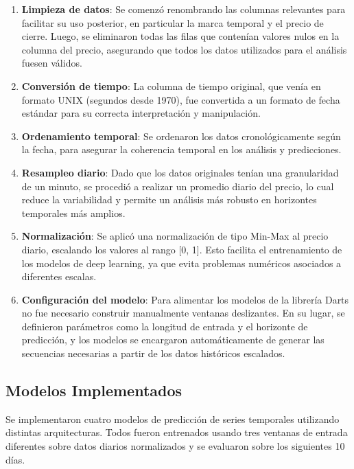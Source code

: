 \documentclass[12pt]{article}
\begin{document}
\begin{enumerate}
\item \textbf{Limpieza de datos}: Se comenzó renombrando las columnas relevantes para facilitar su uso posterior,
en particular la marca temporal y el precio de cierre. Luego, se eliminaron todas las filas que contenían valores
nulos en la columna del precio, asegurando que todos los datos utilizados para el análisis fuesen válidos.

\item \textbf{Conversión de tiempo}: La columna de tiempo original, que venía en formato UNIX (segundos desde 1970),
fue convertida a un formato de fecha estándar para su correcta interpretación y manipulación.

\item \textbf{Ordenamiento temporal}: Se ordenaron los datos cronológicamente según la fecha, para asegurar
la coherencia temporal en los análisis y predicciones.

\item \textbf{Resampleo diario}: Dado que los datos originales tenían una granularidad de un minuto,
se procedió a realizar un promedio diario del precio, lo cual reduce la variabilidad y permite un análisis más
robusto en horizontes temporales más amplios.

\item \textbf{Normalización}: Se aplicó una normalización de tipo Min-Max al precio diario, escalando los valores
al rango [0, 1].
Esto facilita el entrenamiento de los modelos de deep learning, ya que evita problemas numéricos asociados a
diferentes escalas.

\item \textbf{Configuración del modelo}: Para alimentar los modelos de la librería Darts no fue necesario
construir manualmente ventanas deslizantes. En su lugar, se definieron parámetros como la longitud de entrada
y el horizonte de predicción, y los modelos se encargaron automáticamente de generar las secuencias necesarias
a partir de los datos históricos escalados.
\end{enumerate}


\newpage
\subsection{Modelos Implementados}

Se implementaron cuatro modelos de predicción de series temporales utilizando distintas arquitecturas.
Todos fueron entrenados usando tres ventanas de entrada diferentes sobre datos diarios normalizados y se
evaluaron sobre los siguientes 10 días.
\end{document}
